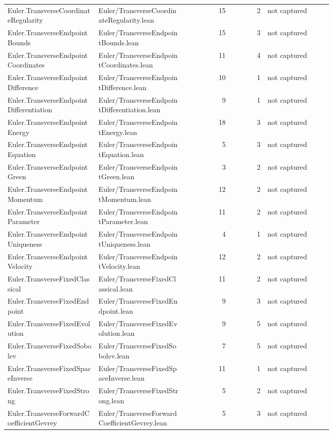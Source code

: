 \documentclass[10pt]{article}
\begin{document}
\begin{longtable}{p{0.28\linewidth}p{0.27\linewidth}r r p{0.20\linewidth}}
Euler.TransverseCoordinateRegularity & Euler/TransverseCoordinateRegularity.lean & 15 & 2 & not captured\\
Euler.TransverseEndpointBounds & Euler/TransverseEndpointBounds.lean & 15 & 3 & not captured\\
Euler.TransverseEndpointCoordinates & Euler/TransverseEndpointCoordinates.lean & 11 & 4 & not captured\\
Euler.TransverseEndpointDifference & Euler/TransverseEndpointDifference.lean & 10 & 1 & not captured\\
Euler.TransverseEndpointDifferentiation & Euler/TransverseEndpointDifferentiation.lean & 9 & 1 & not captured\\
Euler.TransverseEndpointEnergy & Euler/TransverseEndpointEnergy.lean & 18 & 3 & not captured\\
Euler.TransverseEndpointEquation & Euler/TransverseEndpointEquation.lean & 5 & 3 & not captured\\
Euler.TransverseEndpointGreen & Euler/TransverseEndpointGreen.lean & 3 & 2 & not captured\\
Euler.TransverseEndpointMomentum & Euler/TransverseEndpointMomentum.lean & 12 & 2 & not captured\\
Euler.TransverseEndpointParameter & Euler/TransverseEndpointParameter.lean & 11 & 2 & not captured\\
Euler.TransverseEndpointUniqueness & Euler/TransverseEndpointUniqueness.lean & 4 & 1 & not captured\\
Euler.TransverseEndpointVelocity & Euler/TransverseEndpointVelocity.lean & 12 & 2 & not captured\\
Euler.TransverseFixedClassical & Euler/TransverseFixedClassical.lean & 11 & 2 & not captured\\
Euler.TransverseFixedEndpoint & Euler/TransverseFixedEndpoint.lean & 9 & 3 & not captured\\
Euler.TransverseFixedEvolution & Euler/TransverseFixedEvolution.lean & 9 & 5 & not captured\\
Euler.TransverseFixedSobolev & Euler/TransverseFixedSobolev.lean & 7 & 5 & not captured\\
Euler.TransverseFixedSpaceInverse & Euler/TransverseFixedSpaceInverse.lean & 11 & 1 & not captured\\
Euler.TransverseFixedStrong & Euler/TransverseFixedStrong.lean & 5 & 2 & not captured\\
Euler.TransverseForwardCoefficientGevrey & Euler/TransverseForwardCoefficientGevrey.lean & 5 & 3 & not captured\\

\end{longtable}
\end{document}
